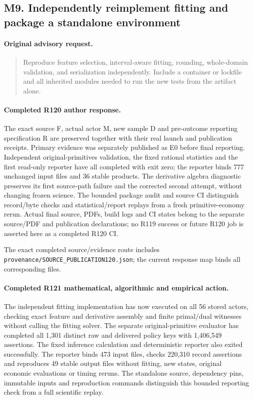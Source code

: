 \subsection{M9. Independently reimplement fitting and package a standalone environment}
\label{response122:M9}

\paragraph{Original advisory request.}
\begin{quote}
Reproduce feature selection, interval-aware fitting, rounding, whole-domain validation, and serialization independently. Include a container or lockfile and all inherited modules needed to run the new tests from the artifact alone.
\end{quote}

\paragraph{Completed R120 author response.}
The exact source F, actual actor M, new sample D and pre-outcome reporting specification R are preserved together with their real launch and publication receipts. Primary evidence was separately published as E0 before final reporting. Independent original-primitives validation, the fixed rational statistics and the first read-only reporter have all completed with exit zero; the reporter binds 777 unchanged input files and 36 stable products. The derivative algebra diagnostic preserves its first source-path failure and the corrected second attempt, without changing frozen science. The bounded package audit and source CI distinguish record/byte checks and statistical/report replays from a fresh primitive-economy rerun. Actual final source, PDFs, build logs and CI states belong to the separate source/PDF and publication declarations; no R119 success or future R120 job is asserted here as a completed R120 CI.

The exact completed source/evidence route includes \nolinkurl{provenance/SOURCE_PUBLICATION120.json}; the current response map binds all corresponding files.

\paragraph{Completed R121 mathematical, algorithmic and empirical action.}
The independent fitting implementation has now executed on all 56 stored actors, checking exact feature and derivative assembly and finite primal/dual witnesses without calling the fitting solver. The separate original-primitive evaluator has completed all 1,301 distinct raw and delivered policy keys with 1,406,549 assertions. The fixed inference calculation and deterministic reporter also exited successfully. The reporter binds 473 input files, checks 220,310 record assertions and reproduces 49 stable output files without fitting, new states, original economic evaluations or timing reruns. The standalone source, dependency pins, immutable inputs and reproduction commands distinguish this bounded reporting check from a full scientific replay.

